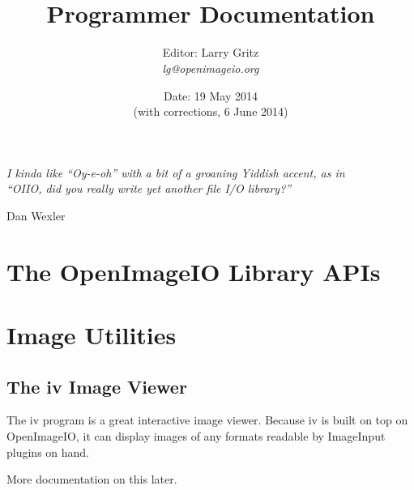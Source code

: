 \documentclass[11pt,letterpaper]{book}
\title{ 
{\Huge{\bf \product}
{\bf\sffamily \versionnumber} \medskip \\ \huge Programmer Documentation
\\ %
} \bigskip }
\author{Editor: Larry Gritz \\
\emph{lg@openimageio.org}
 \bigskip \\
}
\date{{\large 
Date: 19 May 2014
\\ (with corrections, 6 June 2014)
}}
\def\product{{\sffamily OpenImageIO}\xspace}
\def\ImageInput{{\codefont ImageInput}\xspace}
\begin{document}
\frontmatter

\maketitle



\vspace*{2in}

\begin{centering}
\emph{I kinda like ``Oy-e-oh'' with a bit of a groaning Yiddish accent, as in\\
``OIIO, did you really write yet another file I/O library?''} \\
\end{centering}
\medskip
\begin{centering}
\center Dan Wexler \\
\end{centering}




\setcounter{tocdepth}{1}
\tableofcontents

\mainmatter



\part{The OpenImageIO Library APIs}













\part{Image Utilities}



\chapter{The {\kw iv} Image Viewer}
\label{chap:iv}

The {\cf iv} program is a great interactive image viewer.  Because {\cf
  iv} is built on top on \product, it can display images of any formats
readable by \ImageInput plugins on hand.

\medskip

More documentation on this later.
\end{document}

